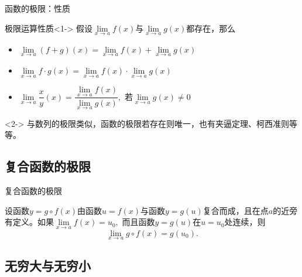 \begin{frame}{函数的极限：性质}

\begin{block}{极限运算性质}<1->
假设$\lim\limits_{x\to a}f(x)$与$\lim\limits_{x\to a}g(x)$都存在，那么
\begin{itemize}
\item $\lim\limits_{x\to a}(f+g)(x) = \lim\limits_{x\to a}f(x)+\lim\limits_{x\to a}g(x)$
\item $\lim\limits_{x\to a}f\cdot g(x) = \lim\limits_{x\to a}f(x)\cdot\lim\limits_{x\to a}g(x)$
\item $\lim\limits_{x\to a}\dfrac{x}{y}(x) = \dfrac{\lim\limits_{x\to a}f(x)}{\lim\limits_{x\to a}g(x)},$ 若$\lim\limits_{x\to a}g(x)\neq0$
\end{itemize}
\end{block}

\begin{remark}<2->
与数列的极限类似，函数的极限若存在则唯一，也有夹逼定理、柯西准则等等。
\end{remark}

\end{frame}


\subsection{复合函数的极限}


\begin{frame}{复合函数的极限}

\begin{thm}[复合函数的极限]
设函数$y = g\circ f(x)$由函数$u = f(x)$与函数$y = g(u)$复合而成，且在点$a$的近旁有定义。如果$\lim\limits_{x\to a}f(x) = u_0,$ 而且函数$y = g(u)$在$u=u_{0}$处连续，则
\[\lim\limits_{x\to a} g\circ f(x) = g(u_0).\]
\end{thm}

\end{frame}


\subsection{无穷大与无穷小}


